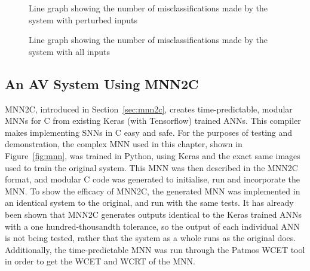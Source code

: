 \begin{figure}[t]
	\centering
	\scalebox{0.9}{}
	\caption{Line graph showing the number of misclassifications made by the system with perturbed inputs \label{fig:sign-graphpert}}
\end{figure}

\begin{figure}[t]
	\centering
	\scalebox{0.9}{}
	\caption{Line graph showing the number of misclassifications made by the system with all inputs \label{fig:sign-graphboth}}
\end{figure}


\subsection{An \ac{AV} System Using \acf{MNN2C}}
\ac{MNN2C}, introduced in Section~\ref{sec:mnn2c}, creates time-predictable, modular \acfp{MNN} for C from existing Keras (with Tensorflow) trained \acp{ANN}. 
This compiler makes implementing \acfp{SNN} in C easy and safe.
For the purposes of testing and demonstration, the complex \ac{MNN} used in this chapter, shown in Figure~\ref{fig:mnn}, was trained in Python, using Keras and the exact same images used to train the original system.
This \ac{MNN} was then described in the \ac{MNN2C} format, and modular C code was generated to initialise, run and incorporate the \ac{MNN}.
To show the efficacy of \ac{MNN2C}, the generated \ac{MNN} was implemented in an identical system to the original, and run with the same tests. 
It has already been shown that \ac{MNN2C} generates outputs identical to the Keras trained \acp{ANN} with a one hundred-thousandth tolerance, so the output of each individual \ac{ANN} is not being tested, rather that the system as a whole runs as the original does.
Additionally, the time-predictable \ac{MNN} was run through the Patmos \ac{WCET} tool in order to get the \ac{WCET} and \ac{WCRT} of the \ac{MNN}.

